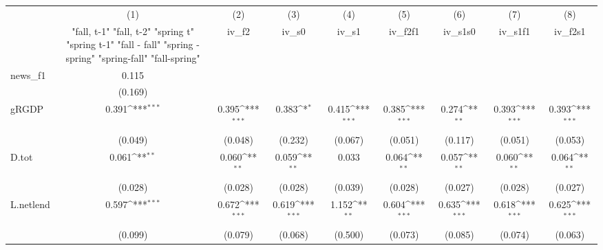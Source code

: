 {
\def\sym#1{\ifmmode^{#1}\else\(^{#1}\)\fi}
\begin{tabular}{l*{8}{c}}
\toprule
            &\multicolumn{1}{c}{(1)}&\multicolumn{1}{c}{(2)}&\multicolumn{1}{c}{(3)}&\multicolumn{1}{c}{(4)}&\multicolumn{1}{c}{(5)}&\multicolumn{1}{c}{(6)}&\multicolumn{1}{c}{(7)}&\multicolumn{1}{c}{(8)}\\
            &\multicolumn{1}{c}{  "fall, t-1" "fall, t-2" "spring t" "spring t-1"  "fall - fall" "spring - spring" "spring-fall" "fall-spring" }&\multicolumn{1}{c}{iv\_f2}&\multicolumn{1}{c}{iv\_s0}&\multicolumn{1}{c}{iv\_s1}&\multicolumn{1}{c}{iv\_f2f1}&\multicolumn{1}{c}{iv\_s1s0}&\multicolumn{1}{c}{iv\_s1f1}&\multicolumn{1}{c}{iv\_f2s1}\\
\midrule
news\_f1     &       0.115         &                     &                     &                     &                     &                     &                     &                     \\
            &     (0.169)         &                     &                     &                     &                     &                     &                     &                     \\
\addlinespace
gRGDP       &       0.391\sym{***}&       0.395\sym{***}&       0.383\sym{*}  &       0.415\sym{***}&       0.385\sym{***}&       0.274\sym{**} &       0.393\sym{***}&       0.393\sym{***}\\
            &     (0.049)         &     (0.048)         &     (0.232)         &     (0.067)         &     (0.051)         &     (0.117)         &     (0.051)         &     (0.053)         \\
\addlinespace
D.tot       &       0.061\sym{**} &       0.060\sym{**} &       0.059\sym{**} &       0.033         &       0.064\sym{**} &       0.057\sym{**} &       0.060\sym{**} &       0.064\sym{**} \\
            &     (0.028)         &     (0.028)         &     (0.028)         &     (0.039)         &     (0.028)         &     (0.027)         &     (0.028)         &     (0.027)         \\
\addlinespace
L.netlend   &       0.597\sym{***}&       0.672\sym{***}&       0.619\sym{***}&       1.152\sym{**} &       0.604\sym{***}&       0.635\sym{***}&       0.618\sym{***}&       0.625\sym{***}\\
            &     (0.099)         &     (0.079)         &     (0.068)         &     (0.500)         &     (0.073)         &     (0.085)         &     (0.074)         &     (0.063)         \\

\end{tabular}}
